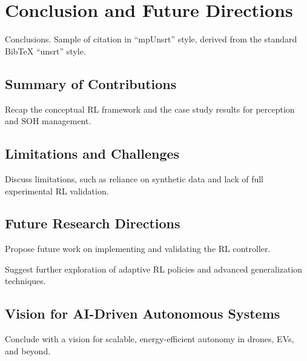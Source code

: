 \chapter{Conclusion and Future Directions}\label{ch:6}
\minitoc

Conclusions. Sample of citation in ``mpUnsrt'' style, derived from the standard {Bib\TeX} ``unsrt'' style.

\newpage

\section{Summary of Contributions}

Recap the conceptual RL framework and the case study results for perception and SOH management.


\section{Limitations and Challenges}

Discuss limitations, such as reliance on synthetic data and lack of full experimental RL validation.


\section{Future Research Directions}

Propose future work on implementing and validating the RL controller.

Suggest further exploration of adaptive RL policies and advanced generalization techniques.


\section{Vision for AI-Driven Autonomous Systems}

Conclude with a vision for scalable, energy-efficient autonomy in drones, EVs, and beyond.

\endinput